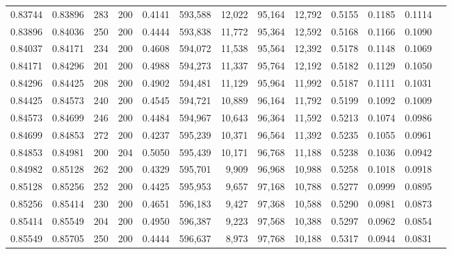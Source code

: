\begin{tabular}{rrrrrrrrrrrrr}
0.83744 & 0.83896 &    283 & 200 &                                     0.4141 & 593,588 &  12,022 &  95,164 &  12,792 & 0.5155 & 0.1185 & 0.1114 \\
0.83896 & 0.84036 &    250 & 200 &                                     0.4444 & 593,838 &  11,772 &  95,364 &  12,592 & 0.5168 & 0.1166 & 0.1090 \\
0.84037 & 0.84171 &    234 & 200 &                                     0.4608 & 594,072 &  11,538 &  95,564 &  12,392 & 0.5178 & 0.1148 & 0.1069 \\
0.84171 & 0.84296 &    201 & 200 &                                     0.4988 & 594,273 &  11,337 &  95,764 &  12,192 & 0.5182 & 0.1129 & 0.1050 \\
0.84296 & 0.84425 &    208 & 200 &                                     0.4902 & 594,481 &  11,129 &  95,964 &  11,992 & 0.5187 & 0.1111 & 0.1031 \\
0.84425 & 0.84573 &    240 & 200 &                                     0.4545 & 594,721 &  10,889 &  96,164 &  11,792 & 0.5199 & 0.1092 & 0.1009 \\
0.84573 & 0.84699 &    246 & 200 &                                     0.4484 & 594,967 &  10,643 &  96,364 &  11,592 & 0.5213 & 0.1074 & 0.0986 \\
0.84699 & 0.84853 &    272 & 200 &                                     0.4237 & 595,239 &  10,371 &  96,564 &  11,392 & 0.5235 & 0.1055 & 0.0961 \\
0.84853 & 0.84981 &    200 & 204 &                                     0.5050 & 595,439 &  10,171 &  96,768 &  11,188 & 0.5238 & 0.1036 & 0.0942 \\
0.84982 & 0.85128 &    262 & 200 &                                     0.4329 & 595,701 &   9,909 &  96,968 &  10,988 & 0.5258 & 0.1018 & 0.0918 \\
0.85128 & 0.85256 &    252 & 200 &                                     0.4425 & 595,953 &   9,657 &  97,168 &  10,788 & 0.5277 & 0.0999 & 0.0895 \\
0.85256 & 0.85414 &    230 & 200 &                                     0.4651 & 596,183 &   9,427 &  97,368 &  10,588 & 0.5290 & 0.0981 & 0.0873 \\
0.85414 & 0.85549 &    204 & 200 &                                     0.4950 & 596,387 &   9,223 &  97,568 &  10,388 & 0.5297 & 0.0962 & 0.0854 \\
0.85549 & 0.85705 &    250 & 200 &                                     0.4444 & 596,637 &   8,973 &  97,768 &  10,188 & 0.5317 & 0.0944 & 0.0831 \\

\end{tabular}
